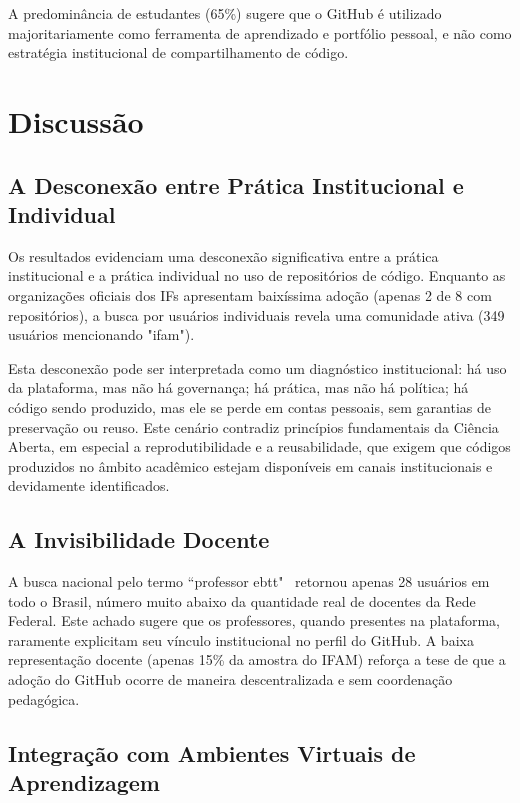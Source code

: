 \documentclass[english, spanish, brazilian]{RBIEarticle}
\begin{document}
A predominância de estudantes (65\%) sugere que o GitHub é utilizado majoritariamente como ferramenta de aprendizado e portfólio pessoal, e não como estratégia institucional de compartilhamento de código.


\section{Discussão}

\subsection{A Desconexão entre Prática Institucional e Individual}

Os resultados evidenciam uma desconexão significativa entre a prática institucional e a prática individual no uso de repositórios de código. Enquanto as organizações oficiais dos IFs apresentam baixíssima adoção (apenas 2 de 8 com repositórios), a busca por usuários individuais revela uma comunidade ativa (349 usuários mencionando "ifam").

Esta desconexão pode ser interpretada como um diagnóstico institucional: há uso da plataforma, mas não há governança; há prática, mas não há política; há código sendo produzido, mas ele se perde em contas pessoais, sem garantias de preservação ou reuso. Este cenário contradiz princípios fundamentais da Ciência Aberta, em especial a reprodutibilidade e a reusabilidade, que exigem que códigos produzidos no âmbito acadêmico estejam disponíveis em canais institucionais e devidamente identificados.

\subsection{A Invisibilidade Docente}

A busca nacional pelo termo ``professor ebtt"~ retornou apenas 28 usuários em todo o Brasil, número muito abaixo da quantidade real de docentes da Rede Federal. Este achado sugere que os professores, quando presentes na plataforma, raramente explicitam seu vínculo institucional no perfil do GitHub. A baixa representação docente (apenas 15\% da amostra do IFAM) reforça a tese de que a adoção do GitHub ocorre de maneira descentralizada e sem coordenação pedagógica.

\subsection{Integração com Ambientes Virtuais de Aprendizagem}
\end{document}
